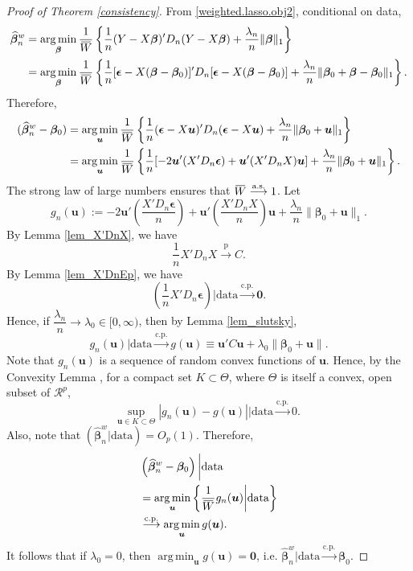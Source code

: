 \documentclass[12pt]{article}
\DeclareMathOperator*{\argmin}{arg\,min} %
\newcommand{\bnw}{\widehat{\bm{\beta}}_n^w} %
\newcommand{\be}{\bm{\beta}} %
\newcommand{\ep}{\bm{\epsilon}} %
\newcommand{\dn}{\frac{1}{n}} %
\newcommand{\CONV}[1]{\stackrel{\text{#1}}{\longrightarrow}} %
\newcommand{\overbar}[1]{\mkern 2mu\overline{\mkern-2mu#1\mkern-2mu}\mkern 2mu}
\newcommand{\bu}{\bm{u}} %
\begin{document}
\begin{proof} [Proof of Theorem \ref{consistency}]
	From \eqref{weighted.lasso.obj2}, conditional on data, 
	\begin{align*}
	\bnw &= \argmin_{\be}
					\dfrac{1}{\overbar{W}}
					\left\{
							\dn (Y - X \be)' D_n (Y - X \be)  
							+ \dfrac{\lambda_n}{n} \| \be \|_1
					\right\} \\
		 &= \argmin_{\be}
		 			\dfrac{1}{\overbar{W}}
		 			\left\{
		 					\dn [\ep - X (\be - \be_0)]' D_n [\ep - X (\be - \be_0)]
		 					+ \dfrac{\lambda_n}{n} \| \be_0 + \be - \be_0 \|_1  
		 			\right\}.  
	\end{align*}
	Therefore, 
	\begin{align*}
	(\bnw - \be_0) &= \argmin_{\bu}
							 \dfrac{1}{\overbar{W}}
							 \left\{
		 							\dn (\ep - X \bu)' D_n (\ep - X \bu)
									+ \dfrac{\lambda_n}{n} \| \be_0 + \bu \|_1  
							 \right\} \\
				   &= \argmin_{\bu}
							 \dfrac{1}{\overbar{W}}
							 \left\{
							 		\dn [-2 \bu' (X' D_n \ep) + \bu' (X' D_n X) \bu]
							 		+ \dfrac{\lambda_n}{n} \| \be_0 + \bu \|_1  
							 \right\}. 
	\end{align*}
	The strong law of large numbers ensures that $\overbar{W} \CONV{a.s.} 1$. Let
	$$
	g_n(\bu) 
	:= -2 \bu' \left( \dfrac{X' D_n \ep}{n} \right) 
		+ \bu' \left( \dfrac{X' D_n X}{n} \right) \bu 
		+ \dfrac{\lambda_n}{n} \| \be_0 + \bu \|_1. 
	$$ 
	By Lemma \ref{lem_X'DnX}, we have 
	$$
	\dn X' D_n X \CONV{p} C.
	$$
	By Lemma \ref{lem_X'DnEp}, we have 
	$$
	\left( \dn X' D_n \ep \right) \bigg| \text{data} \CONV{c.p.} \bm{0}.
	$$
	Hence,  if $\dfrac{\lambda_n}{n} \to \lambda_0 \in [0 , \infty)$, then by Lemma \ref{lem_slutsky}, 
	$$
	g_n(\bu) \big| \text{data}  \CONV{c.p.} g(\bu) \equiv \bu' C \bu + \lambda_0 \| \be_0 + \bu \|.
	$$
	Note that $g_n(\bu)$ is a sequence of random convex functions of $\bu$. Hence, by the Convexity Lemma \citep{Pollard1991}, for a compact set $K \subset \Theta$, where $\Theta$ is itself a convex, open subset of $\mathcal{R}^p$,
	$$
	\underset{\bu \in K \subset \Theta}{\text{sup}} \; 
	|g_n (\bu) - g (\bu)|
	\bigg| \text{data}
	\CONV{c.p.} 0. 	
	$$
	Also, note that $ \left( \bnw \big| \text{data} \right) = O_p(1)$.
	Therefore,
	\begin{align*}
	&\left( \bnw - \be_0 \right) \bigg| \text{data} \\  
	&= 	\argmin_{\bu}
		\left\{
			\dfrac{1}{\overbar{W}} g_n(\bu)
			\bigg| \text{data}  
		\right\} \\ 
	&\CONV{c.p.} \argmin_{\bu} g(\bu).
	\end{align*} 
	It follows that if $\lambda_0 = 0$, then $\argmin_{\bu} g(\bu) = \bm{0}$, i.e. $\bnw \big| \text{data} \CONV{c.p.} \be_0$.
\end{proof}
\end{document}
